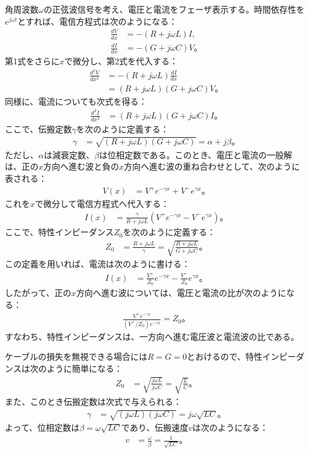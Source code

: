 \documentclass[platex,dvipdfmx,a4paper]{jsarticle}
\newcommand{\bbn}[2]{\frac{d #1}{d #2}}
\newcommand{\nbbn}[3]{\frac{d^{#1} #2}{d #3^{#1}}}
\begin{document}
角周波数$\omega$の正弦波信号を考え、電圧と電流をフェーザ表示する。時間依存性を$e^{j\omega t}$とすれば、電信方程式は次のようになる：
\begin{align*}
  \bbn{V}{x}
  &=-(R+j\omega L)I, \\
  \bbn{I}{x}
  &=-(G+j\omega C)V。
\end{align*}
第1式をさらに$x$で微分し、第2式を代入する：
\begin{align*}
  \nbbn{2}{V}{x}
  &=-(R+j\omega L)\bbn{I}{x} \\
  &=(R+j\omega L)(G+j\omega C)V。
\end{align*}
同様に、電流についても次式を得る：
\begin{align*}
  \nbbn{2}{I}{x}
  &=(R+j\omega L)(G+j\omega C)I。
\end{align*}
ここで、伝搬定数$\gamma$を次のように定義する：
\begin{align*}
  \gamma
  &=\sqrt{(R+j\omega L)(G+j\omega C)}
   =\alpha+j\beta。
\end{align*}
ただし、$\alpha$は減衰定数、$\beta$は位相定数である。このとき、電圧と電流の一般解は、正の$x$方向へ進む波と負の$x$方向へ進む波の重ね合わせとして、次のように表される：
\begin{align*}
  V(x)
  &=V^+e^{-\gamma x}+V^-e^{\gamma x}。
\end{align*}
これを$x$で微分して電信方程式へ代入する：
\begin{align*}
  I(x)
  &=\frac{\gamma}{R+j\omega L}
    \left(V^+e^{-\gamma x}-V^-e^{\gamma x}\right)。
\end{align*}
ここで、特性インピーダンス$Z_0$を次のように定義する：
\begin{align*}
  Z_0
  &=\frac{R+j\omega L}{\gamma}
   =\sqrt{\frac{R+j\omega L}{G+j\omega C}}。
\end{align*}
この定義を用いれば、電流は次のように書ける：
\begin{align*}
  I(x)
  &=\frac{V^+}{Z_0}e^{-\gamma x}
    -\frac{V^-}{Z_0}e^{\gamma x}。
\end{align*}
したがって、正の$x$方向へ進む波については、電圧と電流の比が次のようになる：
\begin{align*}
  \frac{V^+e^{-\gamma x}}{(V^+/Z_0)e^{-\gamma x}}
  =Z_0。
\end{align*}
すなわち、特性インピーダンスは、一方向へ進む電圧波と電流波の比である。

ケーブルの損失を無視できる場合には$R=G=0$とおけるので、特性インピーダンスは次のように簡単になる：
\begin{align*}
  Z_0
  &=\sqrt{\frac{j\omega L}{j\omega C}}
   =\sqrt{\frac{L}{C}}。
\end{align*}
また、このとき伝搬定数は次式で与えられる：
\begin{align*}
  \gamma
  &=\sqrt{(j\omega L)(j\omega C)}
   =j\omega\sqrt{LC}。
\end{align*}
よって、位相定数は$\beta=\omega\sqrt{LC}$であり、伝搬速度$v$は次のようになる：
\begin{align*}
  v
  &=\frac{\omega}{\beta}
   =\frac{1}{\sqrt{LC}}。
\end{align*}
\end{document}
